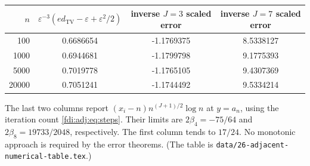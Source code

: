 \documentclass[11pt,letterpaper]{article}
\theoremstyle{remark}\newtheorem{remark}[theorem]{Remark}
\newcommand{\eps}{\varepsilon}\newcommand{\Pois}{\operatorname{Poisson}}
\newcommand{\TV}{d_{\mathrm{TV}}}
\begin{document}
\begin{center}
\begin{tabular}{rccc}
\toprule
$n$ & $\eps^{-3}(e\TV-\eps+\eps^2/2)$ & inverse $J=3$ scaled error & inverse $J=7$ scaled error\\
\midrule
100 & 0.6686654 & -1.1769375 & 8.5338127 \\
1000 & 0.6944681 & -1.1799798 & 9.1775393 \\
5000 & 0.7019778 & -1.1765105 & 9.4307369 \\
20000 & 0.7051241 & -1.1744492 & 9.5334214 \\
\bottomrule
\end{tabular}
\end{center}
The last two columns report $(x_i-n)n^{(J+1)/2}\log n$ at $y=a_n$, using the iteration count \eqref{fdi:adj:eq:steps}. Their limits are $2\beta_4=-75/64$ and $2\beta_8=19733/2048$, respectively. The first column tends to $17/24$. No monotonic approach is required by the error theorems. (The table is \texttt{data/26-adjacent-numerical-table.tex}.)
\end{document}
